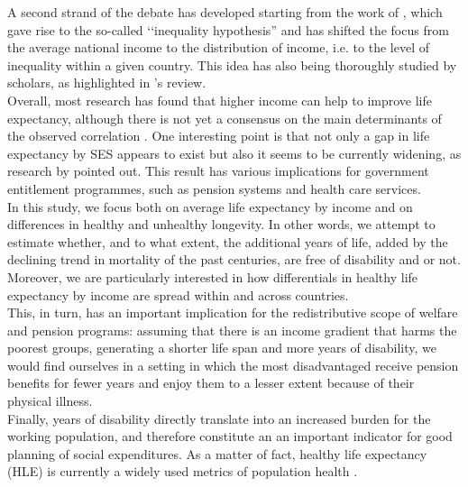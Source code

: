 \indent A second strand of the debate has developed starting from the work of \cite{Wilkinson1992}, which gave rise to the so-called \lq\lq inequality hypothesis'' and has shifted the focus from the average national income to the distribution of income, i.e. to the level of inequality within a given country.  
This idea has also being thoroughly studied by scholars, as highlighted in \cite{Kim2017b}'s review.\\


Overall, most research has found that higher income can help to improve life expectancy, although there is not yet a consensus on the main determinants of the observed correlation \citep{Jetter2016}.
One interesting point is that not only a gap in life expectancy by SES appears to exist but also it seems to be currently widening, as research by \cite{Auerbach2017} pointed out. This result has various implications for government entitlement programmes, such as pension systems and health care services.\\



In this study, we focus both on average life expectancy by income and on differences in healthy and unhealthy longevity. In other words, we attempt to estimate whether, and to what extent, the additional years of life, added by the declining trend in mortality of the past centuries, are free of disability and or not. Moreover, we are particularly interested in how differentials in healthy life expectancy by income are spread within and across countries. \\

This, in turn, has an important implication for the redistributive scope of welfare and pension programs: assuming that there is an income gradient that harms the poorest groups, generating a shorter life span and more years of disability, we would find ourselves in a setting in which the most disadvantaged receive pension benefits for fewer years and enjoy them to a lesser extent because of their physical illness.\\
Finally, years of disability directly translate into an increased burden for the working population, and therefore constitute an an important indicator for good planning of social expenditures. As a matter of fact, healthy life expectancy (HLE) is currently a widely used metrics of population health \citep{Riffe2017}.

